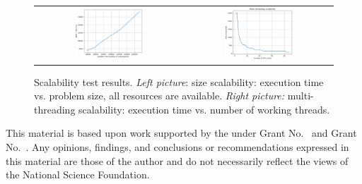 \documentclass[acmsmall,review,anonymous]{acmart}\settopmatter{printfolios=true,printccs=false,printacmref=false}
\begin{document}
\begin{figure}
\begin{tabular}{cc}
\includegraphics[width=0.48\textwidth]{images/scalability-size} & 
\includegraphics[width=0.48\textwidth]{images/scalability-mt} 
\end{tabular}
\caption{Scalability test results. \textit{Left picture}: size scalability: execution time vs. problem size, all resources are available. \textit{Right picture:} multi-threading scalability: execution time vs. number of working threads.}
\label{fig:scalability}
\end{figure}

\begin{acks}                            %
  This material is based upon work supported by the
   under Grant
  No.~ and Grant
  No.~.  Any opinions, findings, and
  conclusions or recommendations expressed in this material are those
  of the author and do not necessarily reflect the views of the
  National Science Foundation.
\end{acks}





\end{document}
